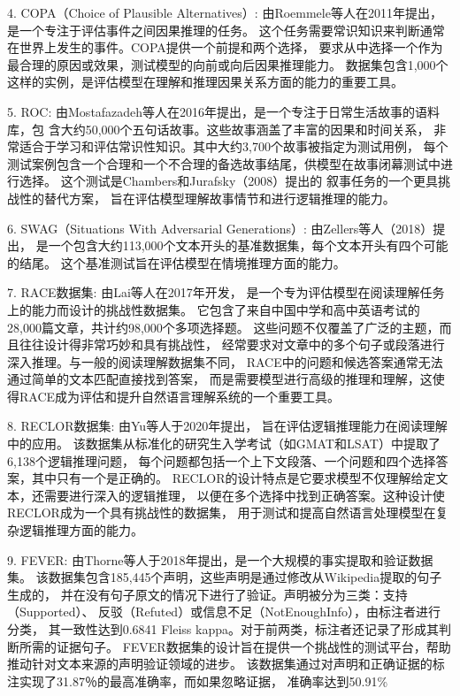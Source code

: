4. COPA（Choice of Plausible Alternatives）\cite{roemmele2011choice}: 由Roemmele等人在2011年提出，是一个专注于评估事件之间因果推理的任务。
这个任务需要常识知识来判断通常在世界上发生的事件。COPA提供一个前提和两个选择，
要求从中选择一个作为最合理的原因或效果，测试模型的向前或向后因果推理能力。
数据集包含1,000个这样的实例，是评估模型在理解和推理因果关系方面的能力的重要工具。

5. ROC\cite{mostafazadeh2016corpus}: 由Mostafazadeh等人在2016年提出，是一个专注于日常生活故事的语料库，包
含大约50,000个五句话故事。这些故事涵盖了丰富的因果和时间关系，
非常适合于学习和评估常识性知识。其中大约3,700个故事被指定为测试用例，
每个测试案例包含一个合理和一个不合理的备选故事结尾，供模型在故事闭幕测试中进行选择。
这个测试是Chambers和Jurafsky（2008）提出的
叙事任务\cite{chambers2008unsupervised}的一个更具挑战性的替代方案，
旨在评估模型理解故事情节和进行逻辑推理的能力。

6. SWAG（Situations With Adversarial Generations）\cite{zellers2018swag}: 由Zellers等人（2018）提出，
是一个包含大约113,000个文本开头的基准数据集，每个文本开头有四个可能的结尾。
这个基准测试旨在评估模型在情境推理方面的能力。

7. RACE数据集\cite{lai2017race}: 由Lai等人在2017年开发，
是一个专为评估模型在阅读理解任务上的能力而设计的挑战性数据集。
它包含了来自中国中学和高中英语考试的28,000篇文章，共计约98,000个多项选择题。
这些问题不仅覆盖了广泛的主题，而且往往设计得非常巧妙和具有挑战性，
经常要求对文章中的多个句子或段落进行深入推理。与一般的阅读理解数据集不同，
RACE中的问题和候选答案通常无法通过简单的文本匹配直接找到答案，
而是需要模型进行高级的推理和理解，这使得RACE成为评估和提升自然语言理解系统的一个重要工具。

8. RECLOR数据集\cite{yu2020reclor}: 由Yu等人于2020年提出，
旨在评估逻辑推理能力在阅读理解中的应用。
该数据集从标准化的研究生入学考试（如GMAT和LSAT）中提取了6,138个逻辑推理问题，
每个问题都包括一个上下文段落、一个问题和四个选择答案，其中只有一个是正确的。
RECLOR的设计特点是它要求模型不仅理解给定文本，还需要进行深入的逻辑推理，
以便在多个选择中找到正确答案。这种设计使RECLOR成为一个具有挑战性的数据集，
用于测试和提高自然语言处理模型在复杂逻辑推理方面的能力。

9. FEVER\cite{thorne2018fever}: 由Thorne等人于2018年提出，是一个大规模的事实提取和验证数据集。
该数据集包含185,445个声明，这些声明是通过修改从Wikipedia提取的句子生成的，
并在没有句子原文的情况下进行了验证。声明被分为三类：支持（Supported）、
反驳（Refuted）或信息不足（NotEnoughInfo），由标注者进行分类，
其一致性达到0.6841 Fleiss kappa。对于前两类，标注者还记录了形成其判断所需的证据句子。
FEVER数据集的设计旨在提供一个挑战性的测试平台，帮助推动针对文本来源的声明验证领域的进步。
该数据集通过对声明和正确证据的标注实现了31.87％的最高准确率，而如果忽略证据，
准确率达到50.91\%

